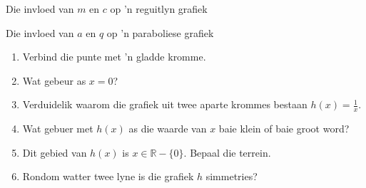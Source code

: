 \begin{Ondersoek}{Die invloed van $m$ en $c$ op 'n reguitlyn grafiek}
\begin{Ondersoek}{Die invloed van $a$ en $q$ op 'n paraboliese grafiek}
\begin{wex}
{\begin{enumerate}[noitemsep, label=\textbf{\arabic*}. ] 
 \item Verbind die punte met 'n gladde kromme.
\item Wat gebeur as $x=0$?
\item Verduidelik waarom die grafiek uit twee aparte krommes bestaan $h(x)=\frac{1}{x}$.
\item Wat gebuer met $h(x)$ as die waarde van $x$ baie klein of baie groot word?
\item Dit gebied van $h(x)$ is $x \in \mathbb{R} - \{0\}$. Bepaal die terrein.
\item Rondom watter twee lyne is die grafiek $h$ simmetries?
\end{enumerate}
}
{
}
\end{wex}
\end{Ondersoek}
\end{Ondersoek}
